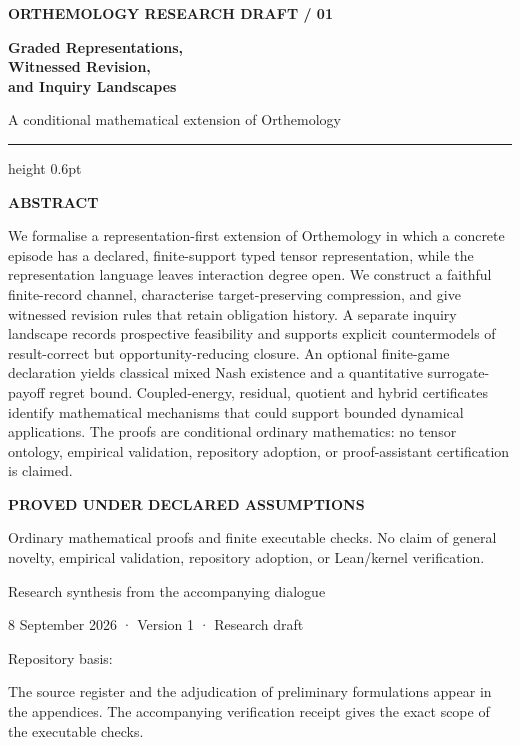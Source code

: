 \documentclass[11pt,a4paper]{article}
\begin{document}
\begin{titlepage}
\thispagestyle{empty}
\vspace*{5mm}
{\sffamily\small\bfseries\color{ink} ORTHEMOLOGY \hfill RESEARCH DRAFT / 01\par}
\vspace{15mm}
{\sffamily\fontsize{29}{34}\selectfont\bfseries\color{ink} Graded Representations,\\[2pt]Witnessed Revision,\\[2pt]and Inquiry Landscapes\par}
\vspace{6mm}
{\sffamily\large\color{softink} A conditional mathematical extension of
Orthemology\par}
\vspace{10mm}
{\color{hairline}\hrule height 0.6pt}
\vspace{8mm}
{\sffamily\small\bfseries\color{ink} ABSTRACT\par}
\vspace{2mm}
We formalise a representation-first extension of Orthemology in which a
concrete episode has a declared, finite-support typed tensor
representation, while the representation language leaves interaction
degree open. We construct a faithful finite-record channel, characterise
target-preserving compression, and give witnessed revision rules that
retain obligation history. A separate inquiry landscape records
prospective feasibility and supports explicit countermodels of
result-correct but opportunity-reducing closure. An optional finite-game
declaration yields classical mixed Nash existence and a quantitative
surrogate-payoff regret bound. Coupled-energy, residual, quotient and
hybrid certificates identify mathematical mechanisms that could support
bounded dynamical applications. The proofs are conditional ordinary
mathematics: no tensor ontology, empirical validation, repository
adoption, or proof-assistant certification is claimed.
\vfill
{\sffamily\small\bfseries\color{ink} PROVED UNDER DECLARED ASSUMPTIONS\par}
{\small Ordinary mathematical proofs and finite executable checks. No claim of general novelty, empirical validation, repository adoption, or Lean/kernel verification.\par}
\vspace{6mm}
{\sffamily\small Research synthesis from the accompanying dialogue\par}
{\sffamily\small\color{softink} 8 September 2026 · Version 1 · Research
draft\par}
\vspace{4mm}
{\footnotesize Repository basis: \par}
\end{titlepage}
\tableofcontents
\vspace{8mm}
{\small\color{softink} The source register and the adjudication of preliminary formulations appear in the appendices. The accompanying verification receipt gives the exact scope of the executable checks.}
\clearpage
{}
\end{document}
